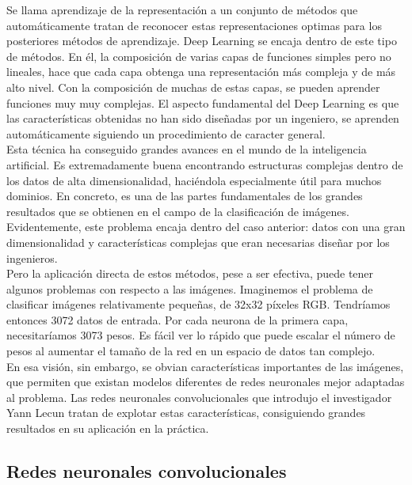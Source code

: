Se llama aprendizaje de la representación a un conjunto de métodos que automáticamente tratan de reconocer estas representaciones optimas para los posteriores métodos de aprendizaje. Deep Learning se encaja dentro de este tipo de métodos. En él, la composición de varias capas de funciones simples pero no lineales, hace que cada capa obtenga una representación más compleja y de más alto nivel. Con la composición de muchas de estas capas, se pueden aprender funciones muy muy complejas. El aspecto fundamental del Deep Learning es que las características obtenidas no han sido diseñadas por un ingeniero, se aprenden automáticamente siguiendo un procedimiento de caracter general.\\
 
Esta técnica ha conseguido grandes avances en el mundo de la inteligencia artificial. Es extremadamente buena encontrando estructuras complejas dentro de los datos de alta dimensionalidad, haciéndola especialmente útil para muchos dominios. En concreto, es una de las partes fundamentales de los grandes resultados que se obtienen en el campo de la clasificación de imágenes. Evidentemente, este problema encaja dentro del caso anterior: datos con una gran dimensionalidad y características complejas que eran necesarias diseñar por los ingenieros.\\

Pero la aplicación directa de estos métodos, pese a ser efectiva, puede tener algunos problemas con respecto a las imágenes. Imaginemos el problema de clasificar imágenes relativamente pequeñas, de 32x32 píxeles RGB. Tendríamos entonces 3072 datos de entrada. Por cada neurona de la primera capa, necesitaríamos 3073 pesos. Es fácil ver lo rápido que puede escalar el número de pesos al aumentar el tamaño de la red en un espacio de datos tan complejo.\\

En esa visión, sin embargo, se obvian características importantes de las imágenes, que permiten que existan modelos diferentes de redes neuronales mejor adaptadas al problema. Las redes neuronales convolucionales que introdujo el investigador Yann Lecun \cite{lecun-89e}\cite{lecun-98} tratan de explotar estas características, consiguiendo grandes resultados en su aplicación en la práctica.\\ 

\subsection{Redes neuronales convolucionales}

